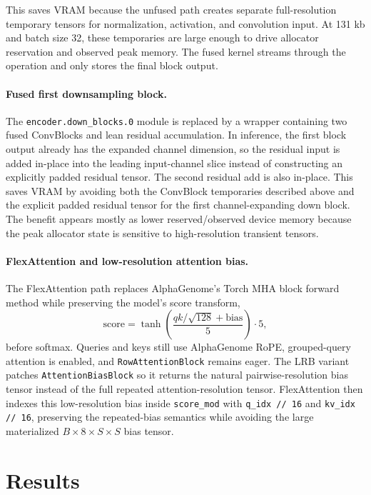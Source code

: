 \documentclass[11pt]{article}
\begin{document}
This saves VRAM because the unfused path creates separate full-resolution
temporary tensors for normalization, activation, and convolution input. At
131 kb and batch size 32, these temporaries are large enough to drive allocator
reservation and observed peak memory. The fused kernel streams through the
operation and only stores the final block output.

\paragraph{Fused first downsampling block.}
The \texttt{encoder.down\_blocks.0} module is replaced by a wrapper containing
two fused ConvBlocks and lean residual accumulation. In inference, the first
block output already has the expanded channel dimension, so the residual input
is added in-place into the leading input-channel slice instead of constructing
an explicitly padded residual tensor. The second residual add is also in-place.
This saves VRAM by avoiding both the ConvBlock temporaries described above and
the explicit padded residual tensor for the first channel-expanding down block.
The benefit appears mostly as lower reserved/observed device memory because the
peak allocator state is sensitive to high-resolution transient tensors.

\paragraph{FlexAttention and low-resolution attention bias.}
The FlexAttention path replaces AlphaGenome's Torch MHA block forward method
while preserving the model's score transform,
\[
  \mathrm{score} =
  \tanh\left(\frac{qk / \sqrt{128} + \mathrm{bias}}{5}\right) \cdot 5,
\]
before softmax. Queries and keys still use AlphaGenome RoPE, grouped-query
attention is enabled, and \texttt{RowAttentionBlock} remains eager. The LRB
variant patches \texttt{AttentionBiasBlock} so it returns the natural
pairwise-resolution bias tensor instead of the full repeated
attention-resolution tensor. FlexAttention then indexes this low-resolution bias
inside \texttt{score\_mod} with \texttt{q\_idx // 16} and
\texttt{kv\_idx // 16}, preserving the repeated-bias semantics while avoiding
the large materialized \(B \times 8 \times S \times S\) bias tensor.

\section{Results}
\end{document}
